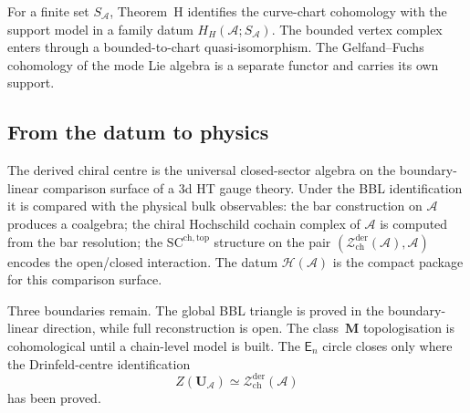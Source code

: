 \documentclass[11pt,reqno]{amsart}
\theoremstyle{definition}
\theoremstyle{remark}
\newcommand{\cA}{\mathcal{A}}
\newcommand{\cH}{\mathcal{H}}
\newcommand{\cZ}{\mathcal{Z}}
\newcommand{\En}{\mathsf{E}_{n}}
\newcommand{\SCchtop}{\mathrm{SC}^{\mathrm{ch,top}}}
\numberwithin{equation}{section}
\begin{document}
For a finite set $S_\cA$, Theorem~H identifies the curve-chart
cohomology with the support model in a family datum
$H_H(\cA;S_\cA)$.  The bounded vertex complex enters through a
bounded-to-chart quasi-isomorphism.  The Gelfand--Fuchs cohomology of
the mode Lie algebra is a separate functor and carries its own
support.


\subsection{From the datum to physics}\label{subsec:physics}

The derived chiral centre is the universal closed-sector algebra on the
boundary-linear comparison surface of a 3d HT gauge theory. Under the
BBL identification it is compared with the physical bulk observables:
the bar construction on $\cA$ produces a coalgebra; the chiral
Hochschild cochain complex of $\cA$ is computed from the bar
resolution; the
$\SCchtop$ structure on the pair
$(\cZ^{\mathrm{der}}_{\mathrm{ch}}(\cA), \cA)$ encodes the
open/closed interaction. The datum $\cH(\cA)$ is the compact package
for this comparison surface.

Three boundaries remain. The global BBL triangle is proved in the
boundary-linear direction, while full reconstruction is open. The
class~$\mathbf{M}$ topologisation is cohomological until a chain-level
model is built. The $\En$ circle closes only where the Drinfeld-centre
identification
\[
Z(\mathbf{U}_{\cA}) \simeq \cZ^{\mathrm{der}}_{\mathrm{ch}}(\cA)
\]
has been proved.


\end{document}
